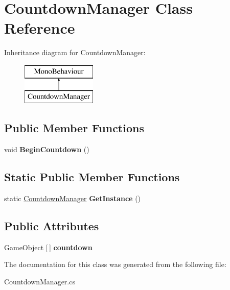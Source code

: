 \hypertarget{class_countdown_manager}{}\section{Countdown\+Manager Class Reference}
\label{class_countdown_manager}
Inheritance diagram for Countdown\+Manager\+:\begin{figure}[H]
\begin{center}
\leavevmode
\includegraphics[height=2.000000cm]{class_countdown_manager}
\end{center}
\end{figure}
\subsection*{Public Member Functions}
\begin{DoxyCompactItemize}
\item 
\hypertarget{class_countdown_manager_a1b2462bf5c2e334fe348e8b121b94198}{}\label{class_countdown_manager_a1b2462bf5c2e334fe348e8b121b94198} 
void {\bfseries Begin\+Countdown} ()
\end{DoxyCompactItemize}
\subsection*{Static Public Member Functions}
\begin{DoxyCompactItemize}
\item 
\hypertarget{class_countdown_manager_a0bcccdefc00af2c6d883d89bd97fbf4a}{}\label{class_countdown_manager_a0bcccdefc00af2c6d883d89bd97fbf4a} 
static \hyperlink{class_countdown_manager}{Countdown\+Manager} {\bfseries Get\+Instance} ()
\end{DoxyCompactItemize}
\subsection*{Public Attributes}
\begin{DoxyCompactItemize}
\item 
\hypertarget{class_countdown_manager_adb8e19b0de8e547d7110eccc368657b2}{}\label{class_countdown_manager_adb8e19b0de8e547d7110eccc368657b2} 
Game\+Object \mbox{[}$\,$\mbox{]} {\bfseries countdown}
\end{DoxyCompactItemize}


The documentation for this class was generated from the following file\+:\begin{DoxyCompactItemize}
\item 
Countdown\+Manager.\+cs\end{DoxyCompactItemize}
